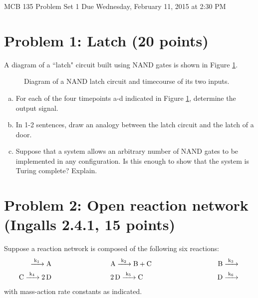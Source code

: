 \documentclass{article}
\begin{document}
\large

MCB 135 Problem Set 1 \hfill Due Wednesday, February 11, 2015 at 2:30 PM

\section*{Problem 1: Latch (20 points)}

A diagram of a ``latch" circuit built using NAND gates is shown in Figure \ref{fig:fig1}.

\begin{figure}[htp] 
\caption{Diagram of a NAND latch circuit and timecourse of its two inputs.} \label{fig:fig1}
\end{figure}  

\begin{enumerate}[a)]
\setlength{\itemsep}{0pt}
\item For each of the four timepoints a-d indicated in Figure \ref{fig:fig1}, determine the output signal.
\item In 1-2 sentences, draw an analogy between the latch circuit and the latch of a door.
\item Suppose that a system allows an arbitrary number of NAND gates to be implemented in any configuration. Is this enough to show that the system is Turing complete? Explain.
\end{enumerate}

\section*{Problem 2: Open reaction network (Ingalls 2.4.1, 15 points)}

Suppose a reaction network is composed of the following six reactions:
\begin{eqnarray*}
\ce{ ->[k_1] \textrm{A} }\hspace{3 cm} & \ce{\textrm{A} ->[k_2] \textrm{B} + \textrm{C} }& \hspace{3 cm} \ce{ \textrm{B}  ->[k_3] }\\
\ce{ \textrm{C}  ->[k_4] 2 \textrm{D}} \hspace{3 cm} & \ce{ 2 \textrm{D}  ->[k_5] \textrm{C}} & \hspace{3 cm}  \ce{ \textrm{D}  ->[k_6]}
\end{eqnarray*}
with mass-action rate constants as indicated.
\end{document}
